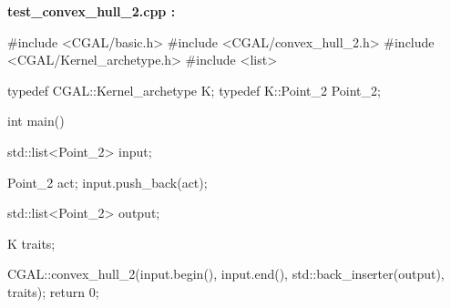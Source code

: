 {\bf test\_convex\_hull\_2.cpp :}

\begin{ccExampleCode}
#include <CGAL/basic.h>
#include <CGAL/convex_hull_2.h>
#include <CGAL/Kernel_archetype.h>
#include <list>

typedef CGAL::Kernel_archetype      K;
typedef K::Point_2                  Point_2;

int main()
{
  std::list<Point_2> input;
  
  Point_2 act;
  input.push_back(act);

  std::list<Point_2> output;

  K  traits;

  CGAL::convex_hull_2(input.begin(), input.end(),
                      std::back_inserter(output), traits);		        
  return 0;
}
\end{ccExampleCode}

\ccHtmlLinksOn


